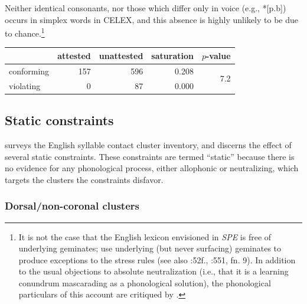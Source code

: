 Neither identical consonants, nor those which differ only in voice (e.g., *[p.b]) occurs in simplex words in CELEX, and this absence is highly unlikely to be due to chance.\footnote{It is not the case that the English lexicon envisioned in \emph{SPE} is free of underlying geminates; \citeauthor{SPE} use underlying (but never surfacing) geminates to produce exceptions to the stress rules (see also \citealt{Burzio1994}:52f., \citealt{Halle1998c}:551, fn. 9). In addition to the usual objections to absolute neutralization (i.e., that it is a learning conundrum mascarading as a phonological solution), the phonological particulars of this account are critiqued by \citet{Ross1972a}.}

\begin{example} 
\begin{tabular}{l r r r r}
\toprule
           & attested & unattested & saturation & $p$-value                   \\
\midrule
conforming & 157      & 596        & 0.208      & \multirow{2}{*}{7.2\e{-09}} \\
violating  & 0        &  87        & 0.000                                    \\
\bottomrule
\end{tabular}
\end{example}

\subsection{Static constraints}

\citet{Pierrehumbert1994} surveys the English syllable contact cluster inventory, and discerns the effect of several static constraints. These constraints are termed ``static'' because there is no evidence for any phonological process, either allophonic or neutralizing, which targets the clusters the constraints disfavor.

\subsubsection{Dorsal/non-coronal clusters}

